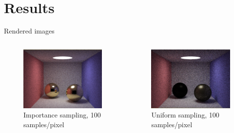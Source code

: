 \documentclass[10pt]{beamer}
\begin{document}
\section{Results}
\begin{frame}{Rendered images}
  \begin{columns}
    \begin{figure}[H]
      \centering
      \includegraphics[width=.9\linewidth]{IS100.png}
      \caption{Importance sampling, 100 samples/pixel}
      \label{fig:sub1}
    \end{figure}

    \begin{figure}[H]
      \centering
      \includegraphics[width=.9\linewidth]{DS100.png}
      \caption{Uniform sampling, 100 samples/pixel}
      \label{fig:sub2}
    \end{figure}
  \end{columns}
\end{frame}
\end{document}

